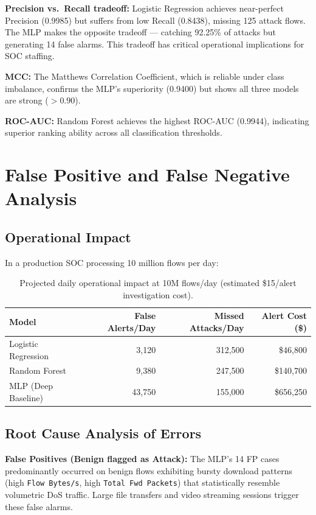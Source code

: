 \documentclass[11pt,a4paper]{article}
\begin{document}
\textbf{Precision vs.\ Recall tradeoff:} Logistic Regression achieves near-perfect Precision (0.9985) but suffers from low Recall (0.8438), missing 125 attack flows. The MLP makes the opposite tradeoff --- catching 92.25\% of attacks but generating 14 false alarms. This tradeoff has critical operational implications for SOC staffing.

\textbf{MCC:} The Matthews Correlation Coefficient, which is reliable under class imbalance, confirms the MLP's superiority (0.9400) but shows all three models are strong ($>0.90$).

\textbf{ROC-AUC:} Random Forest achieves the highest ROC-AUC (0.9944), indicating superior ranking ability across all classification thresholds.

\section{False Positive and False Negative Analysis}

\subsection{Operational Impact}
In a production SOC processing 10 million flows per day:

\begin{table}[H]
\centering
\begin{tabular}{lrrr}
\toprule
\textbf{Model} & \textbf{False Alerts/Day} & \textbf{Missed Attacks/Day} & \textbf{Alert Cost (\$)} \\
\midrule
Logistic Regression & 3,120 & 312,500 & \$46,800 \\
Random Forest & 9,380 & 247,500 & \$140,700 \\
MLP (Deep Baseline) & 43,750 & 155,000 & \$656,250 \\
\bottomrule
\end{tabular}
\caption{Projected daily operational impact at 10M flows/day (estimated \$15/alert investigation cost).}
\end{table}

\subsection{Root Cause Analysis of Errors}

\textbf{False Positives (Benign flagged as Attack):}
The MLP's 14 FP cases predominantly occurred on benign flows exhibiting bursty download patterns (high \texttt{Flow Bytes/s}, high \texttt{Total Fwd Packets}) that statistically resemble volumetric DoS traffic. Large file transfers and video streaming sessions trigger these false alarms.
\end{document}
